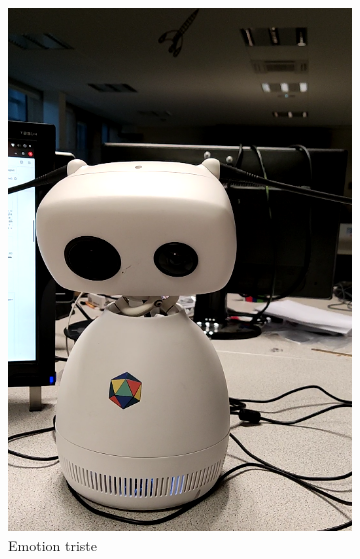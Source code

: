 \documentclass[a4paper,french]{article}
\begin{document}
\begin{figure}[!ht]
\begin{subfigure}{0.25\textwidth}
        \includegraphics[width=\textwidth]{figures/triste.png}
        \caption{Emotion triste}
        \label{triste}
    \end{subfigure}
    \begin{subfigure}{0.25\textwidth}

\end{subfigure}
\end{figure}
\end{document}
